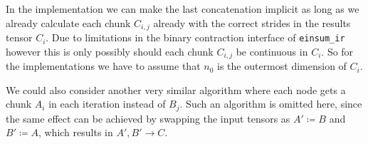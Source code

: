 In the implementation we can make the last concatenation implicit as long as we already calculate each chunk $C_{i,j}$ already with the correct strides in the results tensor $C_i$.
Due to limitations in the binary contraction interface of \texttt{einsum\_ir} however this is only possibly should each chunk $C_{i,j}$ be continuous in $C_i$.
So for the implementations we have to assume that $n_0$ is the outermost dimension of $C_i$.

We could also consider another very similar algorithm where each node gets a chunk $A_i$ in each iteration instead of $B_j$.
Such an algorithm is omitted here, since the same effect can be achieved by swapping the input tensors as $A' \coloneqq B$ and $B' \coloneqq A$, which results in $A',B' \rightarrow C$.